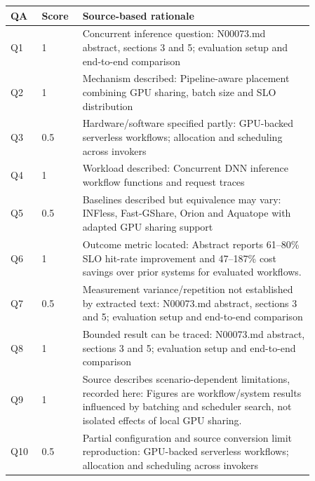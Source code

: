 \begin{longtable}{P{0.09\linewidth}P{0.10\linewidth}P{0.67\linewidth}}
\toprule QA & Score & Source-based rationale\\\midrule\endhead
Q1 & 1 & Concurrent inference question: N00073.md abstract, sections 3 and 5; evaluation setup and end-to-end comparison\\
Q2 & 1 & Mechanism described: Pipeline-aware placement combining GPU sharing, batch size and SLO distribution\\
Q3 & 0.5 & Hardware/software specified partly: GPU-backed serverless workflows; allocation and scheduling across invokers\\
Q4 & 1 & Workload described: Concurrent DNN inference workflow functions and request traces\\
Q5 & 0.5 & Baselines described but equivalence may vary: INFless, Fast-GShare, Orion and Aquatope with adapted GPU sharing support\\
Q6 & 1 & Outcome metric located: Abstract reports 61–80\% SLO hit-rate improvement and 47–187\% cost savings over prior systems for evaluated workflows.\\
Q7 & 0.5 & Measurement variance/repetition not established by extracted text: N00073.md abstract, sections 3 and 5; evaluation setup and end-to-end comparison\\
Q8 & 1 & Bounded result can be traced: N00073.md abstract, sections 3 and 5; evaluation setup and end-to-end comparison\\
Q9 & 1 & Source describes scenario-dependent limitations, recorded here: Figures are workflow/system results influenced by batching and scheduler search, not isolated effects of local GPU sharing.\\
Q10 & 0.5 & Partial configuration and source conversion limit reproduction: GPU-backed serverless workflows; allocation and scheduling across invokers\\
\bottomrule\end{longtable}

